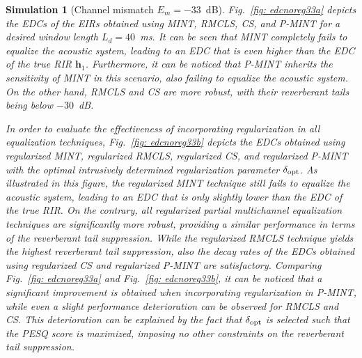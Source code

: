 \documentclass[10pt]{IEEEtran}
\newtheorem{simulation}{Simulation}
\begin{document}
\begin{simulation}[Channel mismatch $E_m=-33$~dB]
\label{sim1} 
Fig.~\ref{fig: edcnoreg33a} depicts the EDCs of the EIRs obtained using MINT, RMCLS, CS, and P-MINT for a desired window length $L_d = 40$~ms.
It can be seen that MINT completely fails to equalize the acoustic system, leading to an EDC that is even higher than the EDC of the true RIR $\mathbf{h}_1$.
Furthermore, it can be noticed that P-MINT inherits the sensitivity of MINT in this scenario, also failing to equalize the acoustic system.
On the other hand, RMCLS and CS are more robust, with their reverberant tails being below $-30$~dB.

In order to evaluate the effectiveness of incorporating regularization in all equalization techniques, Fig.~\ref{fig: edcnoreg33b} depicts the EDCs obtained using regularized MINT, regularized RMCLS, regularized CS, and regularized P-MINT with the optimal intrusively determined regularization parameter $\delta_{\rm opt}$.
As illustrated in this figure, the regularized MINT technique still fails to equalize the acoustic system, leading to an EDC that is only slightly lower than the EDC of the true RIR.
On the contrary, all regularized partial multichannel equalization techniques are significantly more robust, providing a similar performance in terms of the reverberant tail suppression.
While the regularized RMCLS technique yields the highest reverberant tail suppression, also the decay rates of the EDCs obtained using regularized CS and regularized P-MINT are satisfactory.
Comparing Fig.~\ref{fig: edcnoreg33a} and Fig.~\ref{fig: edcnoreg33b}, it can be noticed that a significant improvement is obtained when incorporating regularization in P-MINT, while even a slight performance deterioration can be observed for RMCLS and CS.
This deterioration can be explained by the fact that $\delta_{\rm opt}$ is selected such that the PESQ score is maximized, imposing no other constraints on the reverberant tail suppression.


\end{simulation}
\end{document}
